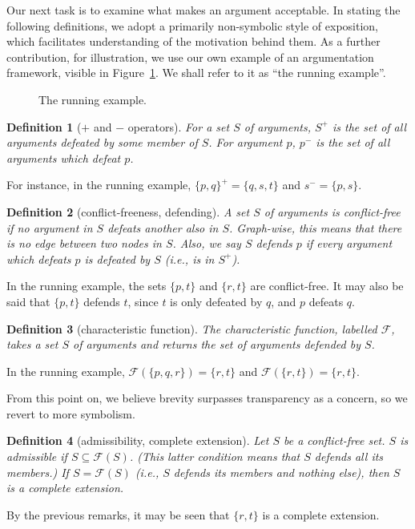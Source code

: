 \documentclass[12pt, a4paper]{article}
\newtheorem{Def}{Definition}[subsection]
\begin{document}
Our next task is to examine what makes an argument acceptable. In stating the following definitions, we adopt a primarily non-symbolic style of exposition, which facilitates understanding of the motivation behind them. As a further contribution, for illustration, we use our own example of an argumentation framework, visible in Figure~\ref{af}. We shall refer to it as ``the running example''.
\begin{figure}
\centering
{}
\caption{The running example.} \label{af}
\end{figure}
\begin{Def}[$+$ and $-$ operators]
For a set $S$ of arguments, $S^{+}$ is the set of all arguments defeated by some member of $S$. For argument $p$, $p^{-}$ is the set of all arguments which defeat $p$.
\end{Def}
For instance, in the running example, $\{ p, q \}^{+} = \{ q, s, t \}$ and $s^{-} = \{ p, s \}$.
\begin{Def}[conflict-freeness, defending]
A set $S$ of arguments is \emph{conflict-free} if no argument in $S$ defeats another also in $S$. Graph-wise, this means that there is no edge between two nodes in $S$. Also, we say $S$ \emph{defends} $p$ if every argument which defeats $p$ is defeated by $S$ (i.e., is in $S^{+}$).
\end{Def}
In the running example, the sets $\{ p, t \}$ and $\{ r, t \}$ are conflict-free. It may also be said that $\{ p, t \}$ defends $t$, since $t$ is only defeated by $q$, and $p$ defeats $q$.
\begin{Def}[characteristic function]
The \emph{characteristic function}, labelled $\mathcal{F}$, takes a set $S$ of arguments and returns the set of arguments defended by $S$.
\end{Def}
In the running example, $\mathcal{F}(\{ p, q, r \}) = \{ r, t \}$ and $\mathcal{F}(\{ r, t \}) = \{ r, t \}$.

From this point on, we believe brevity surpasses transparency as a concern, so we revert to more symbolism.
\begin{Def}[admissibility, complete extension]
Let $S$ be a conflict-free set. $S$ is \emph{admissible} if $S \subseteq \mathcal{F}(S)$. (This latter condition means that $S$ defends all its members.) If $S = \mathcal{F}(S)$ (i.e., $S$ defends its members and nothing else), then $S$ is a \emph{complete extension}.
\end{Def}
By the previous remarks, it may be seen that $\{ r, t \}$ is a complete extension.
\end{document}
